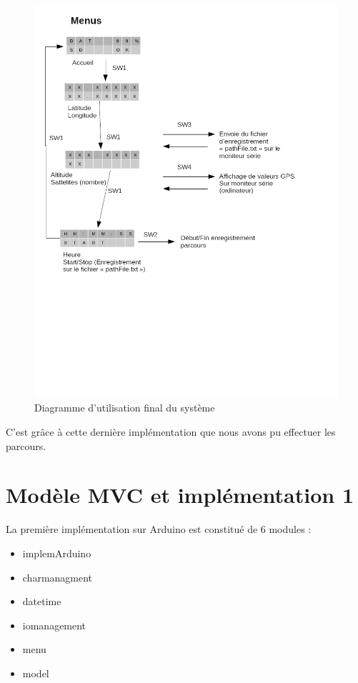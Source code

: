 \documentclass{report}
\begin{document}
\begin{figure}[H]
	\begin{center}
		\includegraphics[scale=0.6]{diagrammeCasUtilisation2.png}
	\end{center}
	\caption{Diagramme d'utilisation final du système}
\end{figure}

C'est grâce à cette dernière implémentation que nous avons pu effectuer
les parcours.
 

\section{Modèle MVC et implémentation 1}

La première implémentation sur Arduino est constitué de 6 modules :
\begin{itemize}
\item implemArduino
\item charmanagment
\item datetime
\item iomanagement
\item menu
\item model
\end{itemize}
\end{document}
